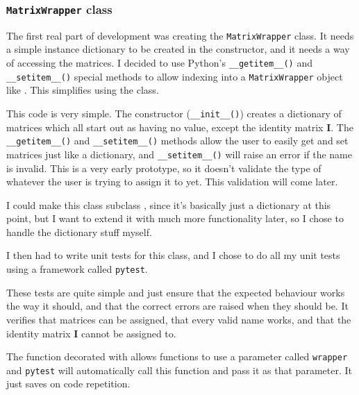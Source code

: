 \documentclass[../development.tex]{subfiles}
\begin{document}
\subsubsection{\texttt{MatrixWrapper} class\label{development:matrices-backend:MatrixWrapper-class}}

The first real part of development was creating the \texttt{MatrixWrapper} class. It needs a simple instance dictionary to be created in the constructor, and it needs a way of accessing the matrices. I decided to use Python's \texttt{\_\_getitem\_\_()} and \texttt{\_\_setitem\_\_()} special methods\cite{python-3-special-methods} to allow indexing into a \texttt{MatrixWrapper} object like . This simplifies using the class.


This code is very simple. The constructor (\texttt{\_\_init\_\_()}) creates a dictionary of matrices which all start out as having no value, except the identity matrix \textbf{I}. The \texttt{\_\_getitem\_\_()} and \texttt{\_\_setitem\_\_()} methods allow the user to easily get and set matrices just like a dictionary, and \texttt{\_\_setitem\_\_()} will raise an error if the name is invalid. This is a very early prototype, so it doesn't validate the type of whatever the user is trying to assign it to yet. This validation will come later.

I could make this class subclass , since it's basically just a dictionary at this point, but I want to extend it with much more functionality later, so I chose to handle the dictionary stuff myself.

I then had to write unit tests for this class, and I chose to do all my unit tests using a framework called \texttt{pytest}.


These tests are quite simple and just ensure that the expected behaviour works the way it should, and that the correct errors are raised when they should be. It verifies that matrices can be assigned, that every valid name works, and that the identity matrix \textbf{I} cannot be assigned to.

The function decorated with  allows functions to use a parameter called \texttt{wrapper} and \texttt{pytest} will automatically call this function and pass it as that parameter. It just saves on code repetition.
\end{document}
